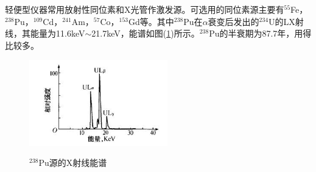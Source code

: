 \documentclass[a4paper]{article}
\begin{document}
轻便型仪器常用放射性同位素和X光管作激发源。可选用的同位素源主要有$^{55}$Fe，$^{238}$Pu，$^{109}$Cd，$^{241}$Am，$^{57}$Co，$^{153}$Gd等。其中$^{238}$Pu在$\alpha$衰变后发出的$^{234}$U的LX射线，其能量为11.6keV$ \sim $21.7keV，能谱如图(\ref{Pu238})所示。$^{238}$Pu的半衰期为87.7年，用得比较多。
\begin{figure}[H]
	\centering
	\includegraphics[width=6cm]{fig/Pu238.jpg}\\
	\caption{$^{238}$Pu源的X射线能谱}\label{Pu238}
\end{figure}
\end{document}
